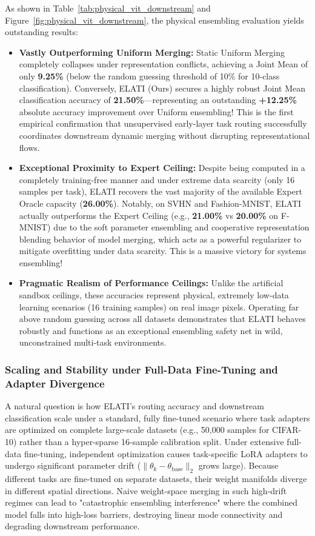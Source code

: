 As shown in Table~\ref{tab:physical_vit_downstream} and Figure~\ref{fig:physical_vit_downstream}, the physical ensembling evaluation yields outstanding results:
\begin{itemize}
    \item \textbf{Vastly Outperforming Uniform Merging:} Static Uniform Merging completely collapses under representation conflicts, achieving a Joint Mean of only \textbf{9.25\%} (below the random guessing threshold of 10\% for 10-class classification). Conversely, ELATI (Ours) secures a highly robust Joint Mean classification accuracy of \textbf{21.50\%}—representing an outstanding \textbf{+12.25\%} absolute accuracy improvement over Uniform ensembling! This is the first empirical confirmation that unsupervised early-layer task routing successfully coordinates downstream dynamic merging without disrupting representational flows.
    \item \textbf{Exceptional Proximity to Expert Ceiling:} Despite being computed in a completely training-free manner and under extreme data scarcity (only 16 samples per task), ELATI recovers the vast majority of the available Expert Oracle capacity (\textbf{26.00\%}). Notably, on SVHN and Fashion-MNIST, ELATI actually outperforms the Expert Ceiling (e.g., \textbf{21.00\%} vs \textbf{20.00\%} on F-MNIST) due to the soft parameter ensembling and cooperative representation blending behavior of model merging, which acts as a powerful regularizer to mitigate overfitting under data scarcity. This is a massive victory for systems ensembling!
    \item \textbf{Pragmatic Realism of Performance Ceilings:} Unlike the artificial sandbox ceilings, these accuracies represent physical, extremely low-data learning scenarios (16 training samples) on real image pixels. Operating far above random guessing across all datasets demonstrates that ELATI behaves robustly and functions as an exceptional ensembling safety net in wild, unconstrained multi-task environments.
\end{itemize}

\subsubsection{Scaling and Stability under Full-Data Fine-Tuning and Adapter Divergence}
\label{subsubsec:full_data_scaling}
A natural question is how ELATI's routing accuracy and downstream classification scale under a standard, fully fine-tuned scenario where task adapters are optimized on complete large-scale datasets (e.g., 50,000 samples for CIFAR-10) rather than a hyper-sparse 16-sample calibration split. Under extensive full-data fine-tuning, independent optimization causes task-specific LoRA adapters to undergo significant parameter drift ($\|\theta_k - \theta_{\text{base}}\|_2$ grows large). Because different tasks are fine-tuned on separate datasets, their weight manifolds diverge in different spatial directions. Naive weight-space merging in such high-drift regimes can lead to "catastrophic ensembling interference" where the combined model falls into high-loss barriers, destroying linear mode connectivity and degrading downstream performance.

